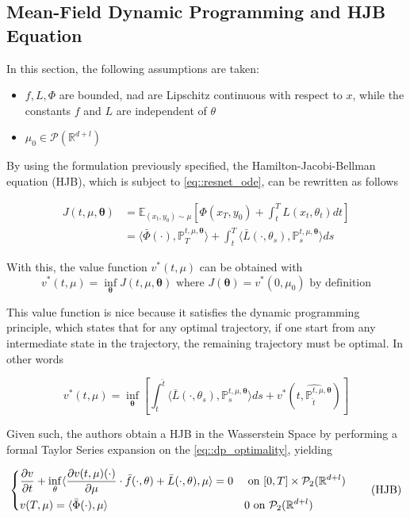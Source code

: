 \subsection{Mean-Field Dynamic Programming and HJB Equation}
In this section, the following assumptions are taken:
\begin{itemize}
    \item $f,L,\Phi$ are bounded, nad are Lipschitz continuous with respect to $x$, while the constants $f$ and $L$ are independent of $\theta $
    \item $\mu_0 \in \mathcal{P}(\mathbb{R}^{d+l})$
\end{itemize}

By using the formulation previously specified, the Hamilton-Jacobi-Bellman equation (HJB), which is subject to \ref{eq::resnet_ode}, can be rewritten as follows

\begin{align*}
J(t,\mu,\bm{\theta}) &= \mathbb{E}_{(x_t,y_0)\sim \mu} \left[ \Phi(x_T,y_0) + \int_t^T L(x_t,\theta_t) dt \right] \\
&= \langle \bar{\Phi}(\cdot),\mathbb{P}^{t,\mu,\bm{\theta}}_T \rangle + \int_t^T \langle \bar{L}(\cdot,\theta_s) , \mathbb{P}_s^{t,\mu,\bm{\theta}} \rangle ds
\end{align*}

With this, the value function $v^*(t,\mu)$ can be obtained with
\begin{equation*}
    v^*(t,\mu) = \inf_{\bm{\theta}} J(t,\mu,\bm{\theta}) \text{ where } J(\bm{\theta}) = v^*(0,\mu_0) \text{ by definition}
\end{equation*}

This value function is nice because it satisfies the dynamic programming principle, which states that for any optimal trajectory, if one start from any intermediate state in the trajectory, the remaining trajectory must be optimal. In other words

\begin{equation*} \label{eq::dp_optimality}
    v^*(t,\mu) = \inf_{\bm{\theta}} \left[ \int_t^{\hat{t}}  \langle \bar{L}(\cdot,\theta_s), \mathbb{P}_s^{t,\mu,\bm{\theta}} \rangle ds + v^* (\hat{t,\mathbb{P}_{\hat{t}}^{t,\mu,\bm{\theta}}}) \right]
\end{equation*}

Given such, the authors obtain a HJB in the Wasserstein Space by performing a formal Taylor Series expansion on the \ref{eq::dp_optimality}, yielding

\begin{equation}
    \begin{dcases}
        \frac{\partial v}{\partial t} + \inf_\theta \langle \frac{\partial v(t,\mu) (\cdot)}{\partial \mu} \cdot \bar{f}(\cdot,\theta) + \bar{L}(\cdot,\theta) , \mu \rangle = 0 & \text{ on } [0,T] \times \mathcal{P}_2(\mathbb{R}^{d+l}) \\
        v(T,\mu) = \langle \bar{\Phi}(\cdot),\mu \rangle & 0  \text{ on }  \mathcal{P}_2(\mathbb{R}^{d+l})
    \end{dcases}
    \tag{HJB}
\end{equation}

